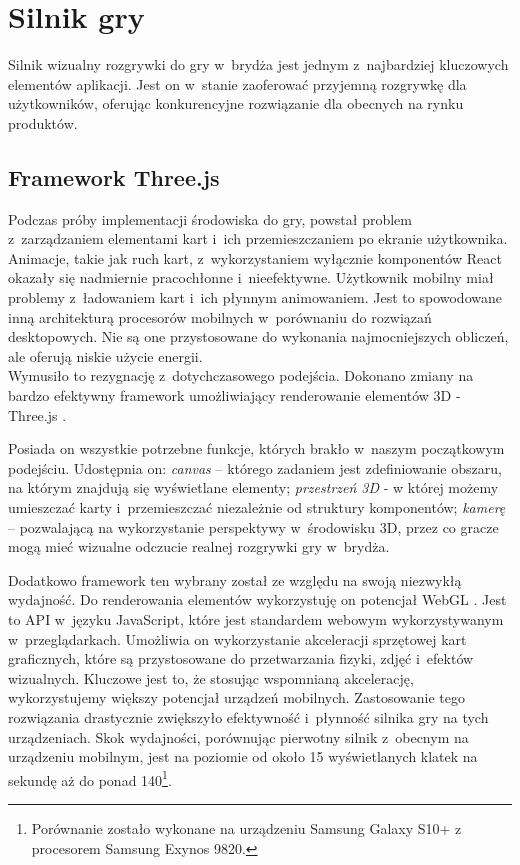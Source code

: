\section{Silnik gry}
\label{subsec:silnik_gry}

Silnik wizualny rozgrywki do gry w~brydża jest jednym z~najbardziej kluczowych
elementów aplikacji. Jest on w~stanie zaoferować przyjemną rozgrywkę dla
użytkowników, oferując konkurencyjne rozwiązanie dla obecnych na rynku produktów.

\subsection{Framework Three.js}
Podczas próby implementacji środowiska do gry, powstał problem z~zarządzaniem
elementami kart i~ich przemieszczaniem po ekranie użytkownika. Animacje,
takie jak ruch kart, z~wykorzystaniem wyłącznie komponentów React
okazały się nadmiernie pracochłonne i~nieefektywne. Użytkownik
mobilny miał problemy z~ładowaniem kart
i~ich płynnym animowaniem. Jest to spowodowane inną architekturą procesorów
mobilnych w~porównaniu do rozwiązań desktopowych. Nie są one przystosowane
do wykonania najmocniejszych obliczeń, ale oferują niskie użycie energii. \\

Wymusiło to rezygnację z~dotychczasowego podejścia. Dokonano zmiany na bardzo
efektywny framework umożliwiający renderowanie elementów 3D - Three.js
\cite{ThreeJS}.

Posiada on wszystkie potrzebne funkcje, których brakło w~naszym początkowym
podejściu. Udostępnia on:
\textit{canvas} -- którego zadaniem jest zdefiniowanie
obszaru, na którym znajdują się wyświetlane elementy;
\textit{przestrzeń 3D} - w której możemy umieszczać
karty i~przemieszczać niezależnie od struktury komponentów;
\textit{kamerę} -- pozwalającą na wykorzystanie perspektywy
w~środowisku 3D, przez co gracze mogą mieć wizualne
odczucie realnej rozgrywki gry w~brydża.


Dodatkowo framework ten wybrany został ze względu na swoją niezwykłą wydajność.
Do renderowania elementów wykorzystuję on potencjał WebGL \cite{WebGL}.
Jest to API
w~języku JavaScript, które jest standardem webowym wykorzystywanym
w~przeglądarkach. Umożliwia on wykorzystanie akceleracji sprzętowej kart
graficznych, które są przystosowane do przetwarzania fizyki, zdjęć
i~efektów wizualnych. Kluczowe jest to, że stosując wspomnianą akcelerację,
wykorzystujemy większy potencjał urządzeń mobilnych. Zastosowanie tego rozwiązania
drastycznie zwiększyło efektywność i~płynność silnika gry na tych urządzeniach.
Skok wydajności, porównując pierwotny silnik z~obecnym na urządzeniu mobilnym,
jest na poziomie od około 15 wyświetlanych klatek na sekundę aż do
ponad 140\footnote{
    Porównanie zostało wykonane na urządzeniu
    Samsung Galaxy S10+ z procesorem Samsung Exynos 9820.
}.

